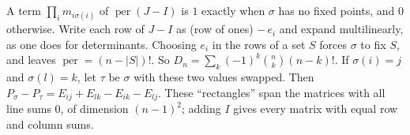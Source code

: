 \documentclass[11pt,a4paper]{article}
\begin{document}
 A term $\prod_i m_{i\sigma(i)}$ of $\operatorname{per}(J-I)$ is $1$ exactly when $\sigma$ has no fixed points, and $0$ otherwise.
 Write each row of $J-I$ as (row of ones) $-\,e_i$ and expand multilinearly, as one does for determinants. Choosing $e_i$ in the rows of a set $S$ forces $\sigma$ to fix $S$, and leaves $\operatorname{per}=(n-|S|)!$. So $D_n=\sum_k(-1)^k\binom nk(n-k)!$.
 If $\sigma(i)=j$ and $\sigma(l)=k$, let $\tau$ be $\sigma$ with these two values swapped. Then $P_\sigma-P_\tau=E_{ij}+E_{lk}-E_{ik}-E_{lj}$. These ``rectangles'' span the matrices with all line sums $0$, of dimension $(n-1)^2$; adding $I$ gives every matrix with equal row and column sums.
\end{document}
